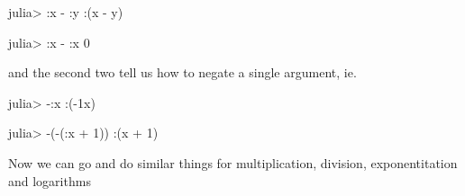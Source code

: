 \documentclass[11pt]{article}
\newenvironment{Shaded}{}{}
\newcommand{\FloatTok}[1]{\textcolor[rgb]{0.25,0.63,0.44}{{#1}}}
\newcommand{\NormalTok}[1]{{#1}}
\begin{document}
\begin{Shaded}
\begin{Highlighting}[]
\NormalTok{julia> :x - :y}
\NormalTok{:(x - y)}

\NormalTok{julia> :x - :x}
\FloatTok{0}
\end{Highlighting}
\end{Shaded}

and the second two tell us how to negate a single argument, ie.

\begin{Shaded}
\begin{Highlighting}[]
\NormalTok{julia> -:x}
\NormalTok{:(-}\FloatTok{1}\NormalTok{x)}

\NormalTok{julia> -(-(:x + }\FloatTok{1}\NormalTok{))}
\NormalTok{:(x + }\FloatTok{1}\NormalTok{)}
\end{Highlighting}
\end{Shaded}

Now we can go and do similar things for multiplication, division,
exponentitation and logarithms
\end{document}
